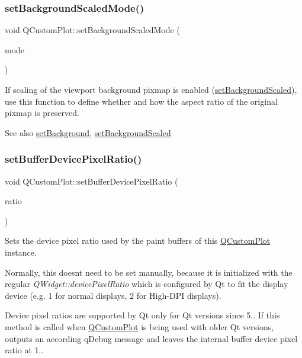 \subsubsection{\texorpdfstring{set\+Background\+Scaled\+Mode()}{setBackgroundScaledMode()}}
{\footnotesize\ttfamily void Q\+Custom\+Plot\+::set\+Background\+Scaled\+Mode (\begin{DoxyParamCaption}\item[{Qt\+::\+Aspect\+Ratio\+Mode}]{mode }\end{DoxyParamCaption})}

If scaling of the viewport background pixmap is enabled (\hyperlink{class_q_custom_plot_a36f0fa1317325dc7b7efea615ee2de1f}{set\+Background\+Scaled}), use this function to define whether and how the aspect ratio of the original pixmap is preserved.

\begin{DoxySeeAlso}{See also}
\hyperlink{class_q_custom_plot_a130358592cfca353ff3cf5571b49fb00}{set\+Background}, \hyperlink{class_q_custom_plot_a36f0fa1317325dc7b7efea615ee2de1f}{set\+Background\+Scaled} 
\end{DoxySeeAlso}
\mbox{\label{class_q_custom_plot_a159162653ad6f8b8bf21263ba5787215}} 
\subsubsection{\texorpdfstring{set\+Buffer\+Device\+Pixel\+Ratio()}{setBufferDevicePixelRatio()}}
{\footnotesize\ttfamily void Q\+Custom\+Plot\+::set\+Buffer\+Device\+Pixel\+Ratio (\begin{DoxyParamCaption}\item[{double}]{ratio }\end{DoxyParamCaption})}

Sets the device pixel ratio used by the paint buffers of this \hyperlink{class_q_custom_plot}{Q\+Custom\+Plot} instance.

Normally, this doesn\textquotesingle{}t need to be set manually, because it is initialized with the regular {\itshape Q\+Widget\+::device\+Pixel\+Ratio} which is configured by Qt to fit the display device (e.\+g. 1 for normal displays, 2 for High-\/\+D\+PI displays).

Device pixel ratios are supported by Qt only for Qt versions since 5.. If this method is called when \hyperlink{class_q_custom_plot}{Q\+Custom\+Plot} is being used with older Qt versions, outputs an according q\+Debug message and leaves the internal buffer device pixel ratio at 1.. \mbox{\label{class_q_custom_plot_a73a6dc47c653bb6f8f030abca5a11852}} 
